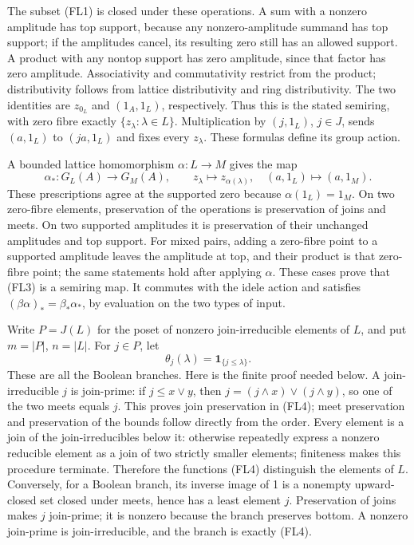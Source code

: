 \documentclass[
  10pt,
]{article}
\begin{document}
The subset (FL1) is closed under these operations. A sum with a nonzero
amplitude has top support, because any nonzero-amplitude summand has top
support; if the amplitudes cancel, its resulting zero still has an
allowed support. A product with any nontop support has zero amplitude,
since that factor has zero amplitude. Associativity and commutativity
restrict from the product; distributivity follows from lattice
distributivity and ring distributivity. The two identities are
\(z_{0_L}\) and \((1_A,1_L)\), respectively. Thus this is the stated
semiring, with zero fibre exactly \(\{z_\lambda:\lambda\in L\}\).
Multiplication by \((j,1_L)\), \(j\in J\), sends \((a,1_L)\) to
\((ja,1_L)\) and fixes every \(z_\lambda\). These formulas define its
group action.

A bounded lattice homomorphism \(\alpha:L\to M\) gives the map \[
\alpha_*:G_L(A)\to G_M(A),\qquad
z_\lambda\mapsto z_{\alpha(\lambda)},\quad
(a,1_L)\mapsto(a,1_M).
\tag{FL3}
\] These prescriptions agree at the supported zero because
\(\alpha(1_L)=1_M\). On two zero-fibre elements, preservation of the
operations is preservation of joins and meets. On two supported
amplitudes it is preservation of their unchanged amplitudes and top
support. For mixed pairs, adding a zero-fibre point to a supported
amplitude leaves the amplitude at top, and their product is that
zero-fibre point; the same statements hold after applying \(\alpha\).
These cases prove that (FL3) is a semiring map. It commutes with the
idele action and satisfies \((\beta\alpha)_*=\beta_*\alpha_*\), by
evaluation on the two types of input.

Write \(P=J(L)\) for the poset of nonzero join-irreducible elements of
\(L\), and put \(m=|P|\), \(n=|L|\). For \(j\in P\), let \[
\theta_j(\lambda)=\mathbf1_{\{j\le\lambda\}}.
\tag{FL4}
\] These are all the Boolean branches. Here is the finite proof needed
below. A join-irreducible \(j\) is join-prime: if \(j\le x\vee y\), then
\(j=(j\wedge x)\vee(j\wedge y)\), so one of the two meets equals \(j\).
This proves join preservation in (FL4); meet preservation and
preservation of the bounds follow directly from the order. Every element
is a join of the join-irreducibles below it: otherwise repeatedly
express a nonzero reducible element as a join of two strictly smaller
elements; finiteness makes this procedure terminate. Therefore the
functions (FL4) distinguish the elements of \(L\). Conversely, for a
Boolean branch, its inverse image of 1 is a nonempty upward-closed set
closed under meets, hence has a least element \(j\). Preservation of
joins makes \(j\) join-prime; it is nonzero because the branch preserves
bottom. A nonzero join-prime is join-irreducible, and the branch is
exactly (FL4).
\end{document}
